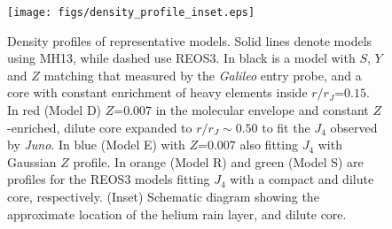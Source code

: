 




%
%
%
%
%
%
%


\begin{figure}[h]
\centering

\texttt{[image: figs/density\_profile\_inset.eps]}

\caption{Density profiles of representative models. Solid lines denote models
    using MH13, while dashed use REOS3. In black is a model with $S$, $Y$ and $Z$
    matching that measured by the \textit{Galileo} entry probe, and a core with constant
    enrichment of heavy elements inside $r/r_J$=$0.15$.  In red (Model
    D) $Z$=$0.007$ in the molecular envelope and constant $Z$-enriched, dilute
    core expanded to $r/r_J\sim0.50$ to fit the $J_4$ observed by
    \textit{Juno}. In blue (Model E) with $Z$=$0.007$ also fitting $J_4$ with
    Gaussian $Z$ profile. In orange (Model R) and green (Model S) are profiles
    for the REOS3 models fitting $J_4$ with a compact and dilute core,
    respectively. (Inset) Schematic diagram showing the approximate location of
the helium rain layer, and dilute core.}
\label{fig:density}
\end{figure}

